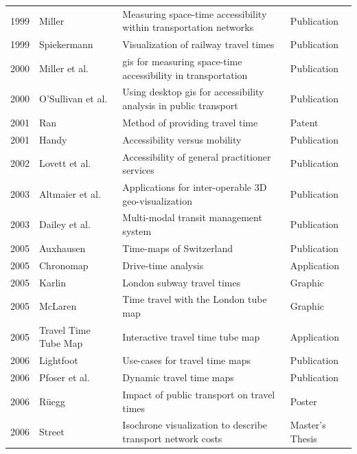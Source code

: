 \begin{table}[htp]
\begin{tabular}{r|l|l|l}
      1999 & Miller \cite{miller1999measuring} & Measuring space-time accessibility within transportation networks & Publication \\
      1999 & Spiekermann \cite{spiekermann1999visualisierung} & Visualization of railway travel times & Publication \\
      2000 & Miller et al. \cite{miller2000gis} & \acrshort{gis} for measuring space-time accessibility in transportation & Publication \\
      2000 & O'Sullivan et al. \cite{o2000using} & Using desktop \acrshort{gis} for accessibility analysis in public transport  & Publication  \\
      2001 & Ran \cite{ran2001method} &  Method of providing travel time  & Patent \\
      2001 & Handy \cite{handy2002accessibility} & Accessibility versus mobility & Publication \\
      2002 & Lovett et al. \cite{lovett2002car} & Accessibility of general practitioner services  & Publication  \\
      2003 & Altmaier et al. \cite{Altmaier2003} & Applications for inter-operable 3D geo-visualization & Publication \\
      2003 & Dailey et al. \cite{dailey2003design} &  Multi-modal transit management system & Publication  \\
      2005 & Auxhausen \cite{axhausen2005zeitkarten} & Time-maps of Switzerland  & Publication  \\
      2005 & Chronomap \cite{Chronomap} & Drive-time analysis  & Application  \\
      2005 & Karlin \cite{Karlin2005}  & London subway travel times  & Graphic \\
      2005 & McLaren \cite{McLaren2005} & Time travel with the London tube map  & Graphic  \\
      2005 & Travel Time Tube Map \cite{Carden2006} & Interactive travel time tube map  & Application  \\
      2006 & Lightfoot \cite{Lightfoot2006} & Use-cases for travel time maps  &  Publication  \\
      2006 & Pfoser et al. \cite{pfoser2006dynamic} &  Dynamic travel time maps & Publication  \\
      2006 & Rüegg \cite{Ruegg2006} & Impact of public transport on travel times  & Poster \\
      2006 & Street \cite{street2006timecontours} & Isochrone visualization to describe transport network costs  & Master's Thesis  \\

\end{tabular}
\end{table}
